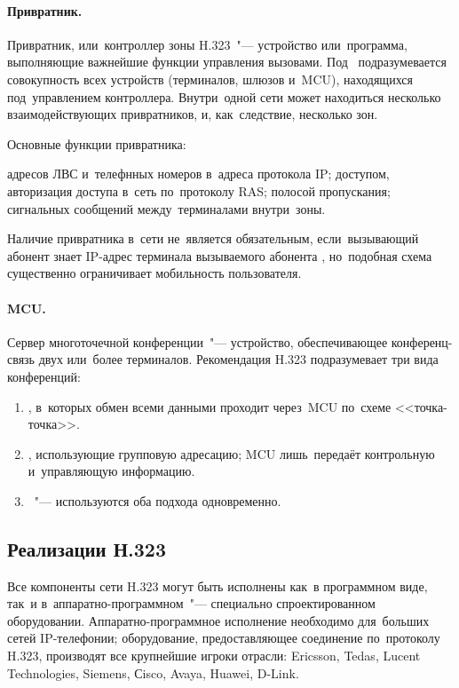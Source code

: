 \paragraph{Привратник.} Привратник, или~контроллер зоны H.323~"--- устройство или~программа, выполняющие важнейшие функции управления вызовами.
Под~ подразумевается совокупность всех устройств (терминалов, шлюзов и~MCU), находящихся под~управлением контроллера.
Внутри~одной сети может находиться несколько взаимодействующих привратников, и, как~следствие, несколько зон.

Основные функции привратника:\listnopagebreak
\begin{itemize}
     адресов ЛВС и~телефнных номеров в~адреса протокола IP;
		 доступом, авторизация доступа в~сеть по~протоколу RAS;
		 полосой пропускания;
		 сигнальных сообщений между~терминалами внутри~зоны.
\end{itemize}

Наличие привратника в~сети не~является обязательным, если~вызывающий абонент знает IP-адрес терминала вызываемого абонента , но~подобная схема существенно ограничивает мобильность пользователя.

\paragraph{MCU.} Сервер многоточечной конференции~"--- устройство, обеспечивающее конференц-связь двух или~более терминалов.
Рекомендация H.323 подразумевает три вида конференций:
\begin{enumerate}
    \item{}, в~которых обмен всеми данными проходит через~MCU по~схеме <<точка-точка>>.
    \item{}, использующие групповую адресацию; MCU лишь~передаёт контрольную и~управляющую информацию.
    \item{}~"--- используются оба подхода одновременно.
\end{enumerate}

\subsection{Реализации Н.323}

Все компоненты сети H.323 могут быть исполнены как~в программном виде, так~и в~аппаратно-программном~"--- специально спроектированном оборудовании.
Аппаратно-программное исполнение необходимо для~больших сетей IP-телефонии; оборудование, предоставляющее соединение по~протоколу H.323, производят все крупнейшие игроки отрасли: Ericsson, Tedas, Lucent Technologies, Siemens, Сisco, Avaya, Huawei, D-Link.

